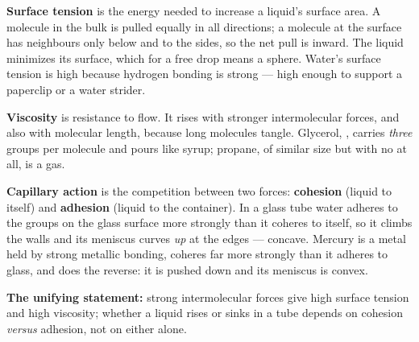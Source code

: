 \documentclass{apchem-worksheet}
\begin{document}
\begin{workedexample}
\textbf{Surface tension} is the energy needed to increase a liquid's
surface area. A molecule in the bulk is pulled equally in all
directions; a molecule at the surface has neighbours only below and to
the sides, so the net pull is inward. The liquid minimizes its surface,
which for a free drop means a sphere. Water's surface tension is high
because hydrogen bonding is strong --- high enough to support a paperclip
or a water strider.

\textbf{Viscosity} is resistance to flow. It rises with stronger
intermolecular forces, and also with molecular length, because long
molecules tangle. Glycerol, , carries \emph{three} 
groups per molecule and pours like syrup; propane, of similar size but
with no  at all, is a gas.

\textbf{Capillary action} is the competition between two forces:
\textbf{cohesion} (liquid to itself) and \textbf{adhesion} (liquid to
the container). In a glass tube water adheres to the  groups on
the glass surface more strongly than it coheres to itself, so it climbs
the walls and its meniscus curves \emph{up} at the edges --- concave.
Mercury is a metal held by strong metallic bonding, coheres far more
strongly than it adheres to glass, and does the reverse: it is pushed
down and its meniscus is convex.

\textbf{The unifying statement:} strong intermolecular forces give high
surface tension and high viscosity; whether a liquid rises or sinks in a
tube depends on cohesion \emph{versus} adhesion, not on either alone.
\end{workedexample}
\end{document}
